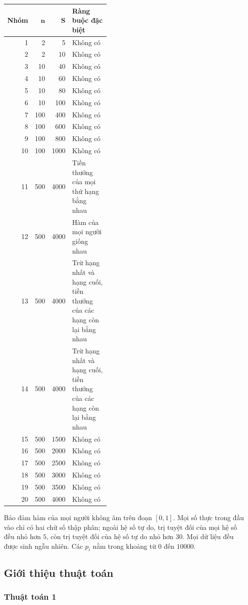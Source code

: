 \documentclass[11pt]{article}
\begin{document}
\begin{center}
\begin{tabular}{r r r >{\raggedright\arraybackslash}p{0.42\linewidth}}
\textbf{Nhóm} & \(\boldsymbol n\) & \(\boldsymbol S\) & \textbf{Ràng buộc đặc biệt} \\
\hline
1 & 2 & 5 & Không có \\
2 & 2 & 10 & Không có \\
3 & 10 & 40 & Không có \\
4 & 10 & 60 & Không có \\
5 & 10 & 80 & Không có \\
6 & 10 & 100 & Không có \\
7 & 100 & 400 & Không có \\
8 & 100 & 600 & Không có \\
9 & 100 & 800 & Không có \\
10 & 100 & 1000 & Không có \\
11 & 500 & 4000 & Tiền thưởng của mọi thứ hạng bằng nhau \\
12 & 500 & 4000 & Hàm của mọi người giống nhau \\
13 & 500 & 4000 & Trừ hạng nhất và hạng cuối, tiền thưởng của các hạng còn lại bằng nhau \\
14 & 500 & 4000 & Trừ hạng nhất và hạng cuối, tiền thưởng của các hạng còn lại bằng nhau \\
15 & 500 & 1500 & Không có \\
16 & 500 & 2000 & Không có \\
17 & 500 & 2500 & Không có \\
18 & 500 & 3000 & Không có \\
19 & 500 & 3500 & Không có \\
20 & 500 & 4000 & Không có
\end{tabular}
\end{center}

Bảo đảm hàm của mọi người không âm trên đoạn \([0,1]\). Mọi số thực trong đầu
vào chỉ có hai chữ số thập phân; ngoài hệ số tự do, trị tuyệt đối của mọi hệ số
đều nhỏ hơn \(5\), còn trị tuyệt đối của hệ số tự do nhỏ hơn \(30\). Mọi dữ liệu
đều được sinh ngẫu nhiên. Các \(p_i\) nằm trong khoảng từ \(0\) đến \(10000\).

\subsection{Giới thiệu thuật toán}

\subsubsection{Thuật toán 1}
\end{document}
